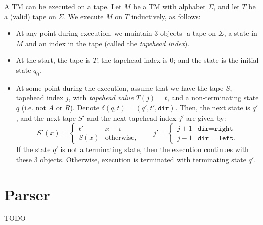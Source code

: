 A TM can be executed on a tape. Let $M$ be a TM with alphabet $\Sigma$, and let $T$ be a (valid) tape on $\Sigma$. We execute $M$ on $T$ inductively, as follows:
\begin{itemize}
    \item At any point during execution, we maintain 3 objects- a tape on $\Sigma$, a state in $M$ and an index in the tape (called the \emph{tapehead index}). 
    \item At the start, the tape is $T$; the tapehead index is $0$; and the state is the initial state $q_0$. 
    \item At some point during the execution, assume that we have the tape $S$, tapehead index $j$, with \emph{tapehead value} $T(j) = t$, and a non-terminating state $q$ (i.e. not $A$ or $R$). Denote $\delta(q, t) = (q', t', \texttt{dir})$. Then, the next state is $q'$, and the next tape $S'$ and the next tapehead index $j'$ are given by:
    \[S'(x) = \begin{cases}
        t' & x = i \\
        S(x) & \text{otherwise},
    \end{cases} \qquad j' = \begin{cases}
        j+1 & \texttt{dir} = \texttt{right} \\
        j-1 & \texttt{dir} = \texttt{left}.
    \end{cases}\]
    If the state $q'$ is not a terminating state, then the execution continues with these 3 objects. Otherwise, execution is terminated with terminating state $q'$.
\end{itemize}

\section{Parser}
TODO